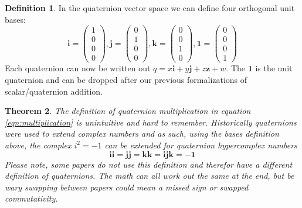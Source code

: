 \documentclass{amsart}
\newtheorem{theorem}{Theorem}[section]
\theoremstyle{definition}
\newtheorem{definition}[theorem]{Definition}
\theoremstyle{remark}
\numberwithin{equation}{section}
\begin{document}
\begin{definition}
  In the quaternion vector space we can define four orthogonal unit bases:
  \begin{equation}
    \mathbf{i} =
    \begin{pmatrix}
      1 \\
      0 \\
      0 \\
      0
    \end{pmatrix},
    \mathbf{j} =
    \begin{pmatrix}
      0 \\
      1 \\
      0 \\
      0
    \end{pmatrix}, 
    \mathbf{k} =
    \begin{pmatrix}
      0 \\
      0 \\
      1 \\
      0
    \end{pmatrix}, 
    \mathbf{1} =
    \begin{pmatrix}
      0 \\
      0 \\
      0 \\
      1
    \end{pmatrix}
  \end{equation}
  Each quaternion can now be written out $q = x \mathbf{i} + y \mathbf{j} + z \mathbf{z} + w$. The $\mathbf{1}$ is the unit quaternion and can be dropped after our previous formalizations of scalar/quaternion addition.
\end{definition}

\begin{theorem}
  The definition of quaternion multiplication in equation \ref{eqn:multiplication} is unintuitive and hard to remember. Historically quaternions were used to extend complex numbers and as such, using the bases definition above, the complex $i^2=-1$ can be extended for quaternion hypercomplex numbers
  \begin{equation}
    \mathbf{ii} = \mathbf{jj} = \mathbf{kk} = \mathbf{ijk} = -\mathbf{1}
  \end{equation}
  Please note, some papers do not use this definition and therefor have a different definition of quaternions. The math can all work out the same at the end, but be wary swapping between papers could mean a missed sign or swapped commutativity.
\end{theorem}
\end{document}
